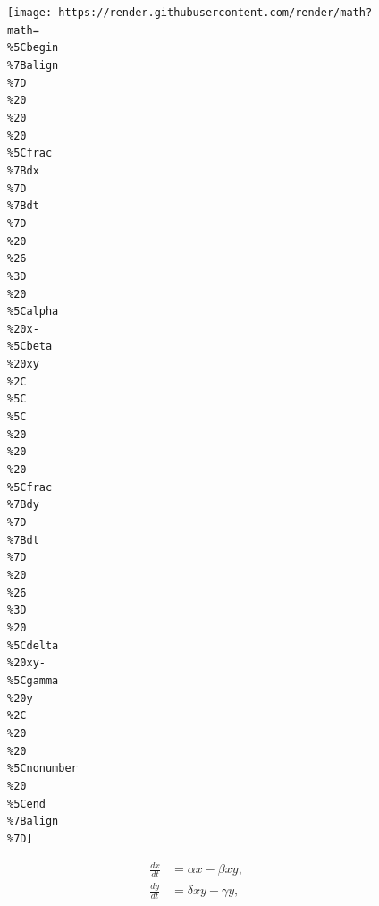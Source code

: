 \documentclass[
]{article}
\begin{document}
\begin{figure}
\centering
\texttt{[image: https://render.githubusercontent.com/render/math?math=\\\%5Cbegin\\\%7Balign\\\%7D\\\%20\\\%20\\\%20\\\%5Cfrac\\\%7Bdx\\\%7D\\\%7Bdt\\\%7D\\\%20\\\%26\\\%3D\\\%20\\\%5Calpha\\\%20x-\\\%5Cbeta\\\%20xy\\\%2C\\\%5C\\\%5C\\\%20\\\%20\\\%20\\\%5Cfrac\\\%7Bdy\\\%7D\\\%7Bdt\\\%7D\\\%20\\\%26\\\%3D\\\%20\\\%5Cdelta\\\%20xy-\\\%5Cgamma\\\%20y\\\%2C\\\%20\\\%20\\\%5Cnonumber\\\%20\\\%5Cend\\\%7Balign\\\%7D]}
\caption{\begin{align}   \frac{dx}{dt} &= \alpha x-\beta xy,\\   \frac{dy}{dt} &= \delta xy-\gamma y,  \nonumber \end{align}}
\end{figure}
\end{document}
